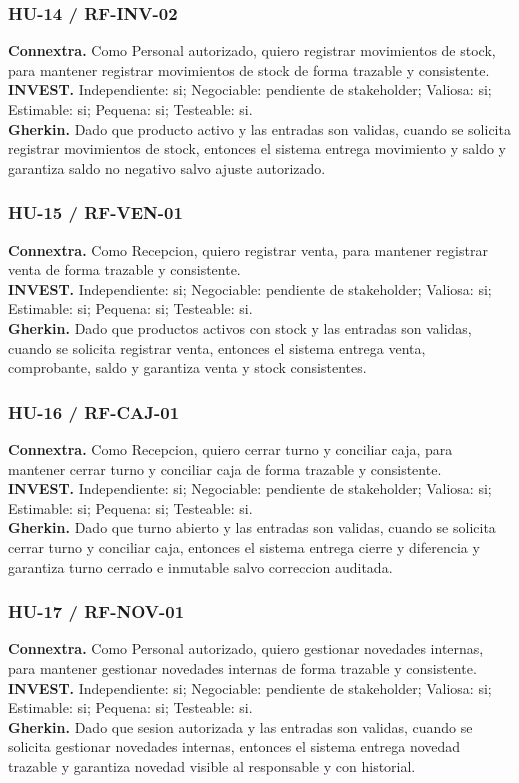 \documentclass[11pt,a4paper,twoside]{article}
\begin{document}
\subsubsection{HU-14 / RF-INV-02}
\textbf{Connextra.} Como Personal autorizado, quiero registrar movimientos de stock, para mantener registrar movimientos de stock de forma trazable y consistente.\\
\textbf{INVEST.} Independiente: si; Negociable: pendiente de stakeholder; Valiosa: si; Estimable: si; Pequena: si; Testeable: si.\\
\textbf{Gherkin.} Dado que producto activo y las entradas son validas, cuando se solicita registrar movimientos de stock, entonces el sistema entrega movimiento y saldo y garantiza saldo no negativo salvo ajuste autorizado.

\subsubsection{HU-15 / RF-VEN-01}
\textbf{Connextra.} Como Recepcion, quiero registrar venta, para mantener registrar venta de forma trazable y consistente.\\
\textbf{INVEST.} Independiente: si; Negociable: pendiente de stakeholder; Valiosa: si; Estimable: si; Pequena: si; Testeable: si.\\
\textbf{Gherkin.} Dado que productos activos con stock y las entradas son validas, cuando se solicita registrar venta, entonces el sistema entrega venta, comprobante, saldo y garantiza venta y stock consistentes.

\subsubsection{HU-16 / RF-CAJ-01}
\textbf{Connextra.} Como Recepcion, quiero cerrar turno y conciliar caja, para mantener cerrar turno y conciliar caja de forma trazable y consistente.\\
\textbf{INVEST.} Independiente: si; Negociable: pendiente de stakeholder; Valiosa: si; Estimable: si; Pequena: si; Testeable: si.\\
\textbf{Gherkin.} Dado que turno abierto y las entradas son validas, cuando se solicita cerrar turno y conciliar caja, entonces el sistema entrega cierre y diferencia y garantiza turno cerrado e inmutable salvo correccion auditada.

\subsubsection{HU-17 / RF-NOV-01}
\textbf{Connextra.} Como Personal autorizado, quiero gestionar novedades internas, para mantener gestionar novedades internas de forma trazable y consistente.\\
\textbf{INVEST.} Independiente: si; Negociable: pendiente de stakeholder; Valiosa: si; Estimable: si; Pequena: si; Testeable: si.\\
\textbf{Gherkin.} Dado que sesion autorizada y las entradas son validas, cuando se solicita gestionar novedades internas, entonces el sistema entrega novedad trazable y garantiza novedad visible al responsable y con historial.
\end{document}
